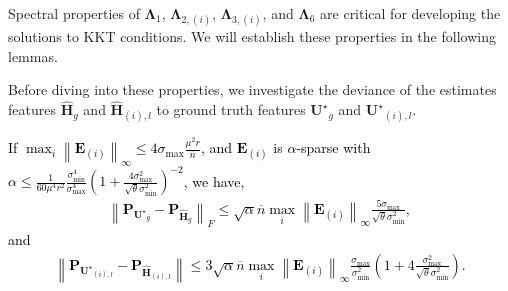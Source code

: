\documentclass[twoside,11pt]{article}
\newcommand{\revise}[1]{\textcolor{black}{ #1}}
\newcommand{\norm}[1]{\left\lVert#1\right\rVert}
\newcommand{\matE}{\mathbf{E}}
\newcommand{\hmatH}{{\hat{\mathbf{H}}}{}}
\newcommand{\matP}{\mathbf{P}}
\newcommand{\matLambda}{\mathbf{\Lambda}}
\newcommand{\matUst}{{\mathbf{U}^\star}}
\newcommand{\gop}{\sigma_{\max}}
\newcommand{\bn}{{\overline{n}}}
\newcommand{\sabnb}{\sqrt{\alpha} \bn\max_{i}\norm{\matE_{(i)}}_{\infty}}
\newcommand{\sm}{\sigma_{\min}}
\newcommand{\sms}{\sigma_{\min}^2}
\begin{document}
Spectral properties of $\matLambda_1$, $\matLambda_{2,(i)}$, $\matLambda_{3,(i)}$, and $\matLambda_{6}$ are critical for developing the solutions to KKT conditions. We will establish these properties in the following lemmas.

Before diving into these properties, we investigate the deviance of the estimates features $\hmatH_g$ and $\hmatH_{(i),l}$ to ground truth features $\matUst_g$ and $\matUst_{(i),l}$. 

\revise{\begin{lemma}
\label{lm:deltapupperbound}
If $\max_i\norm{\matE_{(i)}}_{\infty}\le 4\gop\frac{\mu^2 r}{\bn}$, and $\matE_{(i)}$ is $\alpha$-sparse with
$\alpha\le \frac{1}{60\mu^4 r^2}\frac{\sm^4}{\gop^4}\left(1+\frac{4\gop^2}{\sqrt{\theta}\sms}\right)^{-2}$, we have,
 \begin{align}
\label{eqn:dpgfnorm}
\norm{\matP_{\matUst_g}-\matP_{\hmatH_g}}_F\le \sabnb\frac{5\gop}{\sqrt{\theta}\sms},
 \end{align}   
 and 
 \begin{align}
\label{eqn:dpifnorm}
\norm{\matP_{\matUst_{(i),l}}-\matP_{\hmatH_{(i),l}}}\le 3\sabnb\frac{\gop}{\sms}\left(1+4\frac{\gop^2}{\sqrt{\theta}\sms}\right).
 \end{align} 
\end{lemma}}
\end{document}
